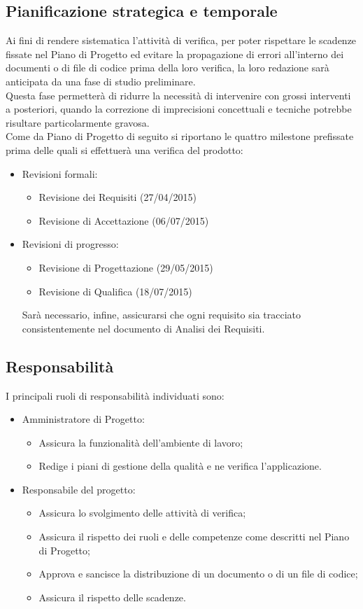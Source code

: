 {\subsection{Pianificazione strategica e temporale}{
	Ai fini di rendere sistematica l'attività di verifica, per poter rispettare le scadenze fissate nel Piano di Progetto ed evitare la propagazione di errori all'interno dei documenti o di file di codice prima della loro verifica, la loro redazione sarà anticipata da una fase di studio preliminare. \\
	Questa fase permetterà di ridurre la necessità di intervenire con grossi interventi a posteriori, quando la correzione di imprecisioni concettuali e tecniche potrebbe risultare particolarmente gravosa. \\
	Come da Piano di Progetto di seguito si riportano le quattro milestone prefissate prima delle quali si effettuerà una verifica del prodotto:
	\begin{itemize}
		\item Revisioni formali:
		\begin{itemize}
			\item Revisione dei Requisiti (27/04/2015)
			\item Revisione di Accettazione (06/07/2015)
		\end{itemize}
		\item Revisioni di progresso:
		\begin{itemize}
			\item Revisione di Progettazione (29/05/2015)
			\item Revisione di Qualifica (18/07/2015)
		\end{itemize}
		Sarà necessario, infine, assicurarsi che ogni requisito sia tracciato consistentemente nel documento di Analisi dei Requisiti.
	\end{itemize}
	}
\subsection{Responsabilità}{
I principali ruoli di responsabilità individuati sono:
\begin{itemize}
	\item Amministratore di Progetto:
	\begin{itemize}
		\item Assicura la funzionalità dell'ambiente di lavoro;
		\item Redige i piani di gestione della qualità e ne verifica l'applicazione.
	\end{itemize}
	\item Responsabile del progetto:
	\begin{itemize}
		\item Assicura lo svolgimento delle attività di verifica;
		\item Assicura il rispetto dei ruoli e delle competenze come descritti nel Piano di Progetto;
		\item Approva e sancisce la distribuzione di un documento o di un file di codice;
		\item Assicura il rispetto delle scadenze.
	\end{itemize}
\end{itemize}
}
}

